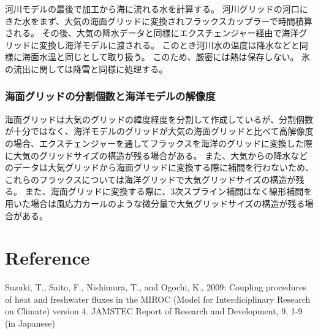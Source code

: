 河川モデルの最後で加工から海に流れる水を計算する。
河川グリッドの河口にきた水をまず、大気の海面グリッドに変換されフラックスカップラーで時間積算される。
その後、大気の降水データと同様にエクスチェンジャー経由で海洋グリッドに変換し海洋モデルに渡される。
このとき河川水の温度は降水などと同様に海面水温と同じとして取り扱う。
このため、厳密には熱は保存しない。
氷の流出に関しては降雪と同様に処理する。

\hypertarget{ux6d77ux9762ux30b0ux30eaux30c3ux30c9ux306eux5206ux5272ux500bux6570ux3068ux6d77ux6d0bux30e2ux30c7ux30ebux306eux89e3ux50cfux5ea6}{%
\subsubsection{海面グリッドの分割個数と海洋モデルの解像度}\label{ux6d77ux9762ux30b0ux30eaux30c3ux30c9ux306eux5206ux5272ux500bux6570ux3068ux6d77ux6d0bux30e2ux30c7ux30ebux306eux89e3ux50cfux5ea6}}

海面グリッドは大気のグリッドの緯度経度を分割して作成しているが、分割個数が十分ではなく、海洋モデルのグリッドが大気の海面グリッドと比べて高解像度の場合、エクスチェンジャーを通してフラックスを海洋のグリッドに変換した際に大気のグリッドサイズの構造が残る場合がある。
また、大気からの降水などのデータは大気グリッドから海面グリッドに変換する際に補間を行わないため、これらのフラックスについては海洋グリッドで大気グリッドサイズの構造が残る。
また、海面グリッドに変換する際に、3次スプライン補間はなく線形補間を用いた場合は風応力カールのような微分量で大気グリッドサイズの構造が残る場合がある。

\hypertarget{reference}{%
\section{Reference}\label{reference}}

Suzuki, T., Saito, F., Nishimura, T., and Ogochi, K., 2009: Coupling
procedures of heat and freshwater fluxes in the MIROC (Model for
Interdiciplinary Research on Climate) version 4. JAMSTEC Report of
Research and Development, 9, 1-9 (in Japanese)
